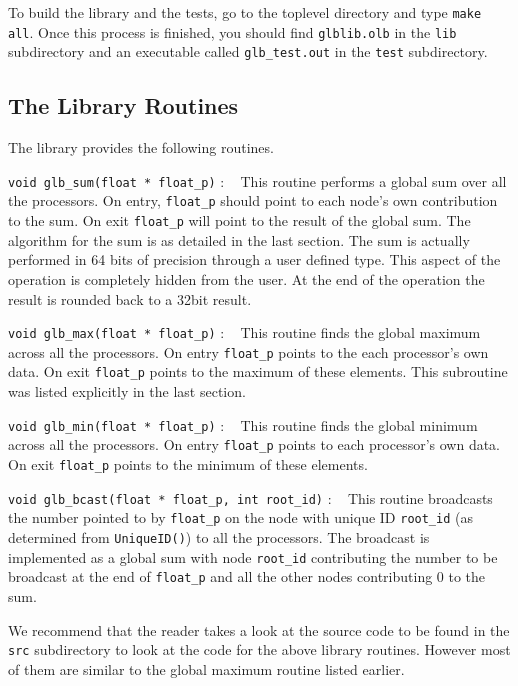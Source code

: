 To build the library and the tests, go to the toplevel directory 
and type {\tt make all}. Once this process is finished, you should
find {\tt glblib.olb} in the {\tt lib} subdirectory and an
executable called {\tt glb\_test.out} in the {\tt test} subdirectory.

\subsection{The Library Routines}
The library provides the following routines.
\begin{description}
\item{ {\tt void glb\_sum(float * float\_p)} : \ } This routine
performs a global sum over all the processors. On entry, {\tt float\_p} 
should point to each node's own contribution to the sum. On exit
{\tt float\_p} will point to the result of the global sum. The algorithm
for the sum is as detailed in the last section. The sum is actually 
performed in 64 bits of precision through a user defined type. This
aspect of the operation is completely hidden from the user. At the 
end of the operation the result is rounded back to a 32bit result. 
\item{ {\tt void glb\_max(float * float\_p)} : \ } This routine 
finds the global maximum across all the processors. On entry {\tt float\_p}
points to the each processor's own data. On exit {\tt float\_p} points
to the maximum of these elements. This subroutine was listed explicitly in
the last section.
\item{ {\tt void glb\_min(float * float\_p)} : \ } This routine
finds the global minimum across all the processors. On entry {\tt float\_p}
points to each processor's own data. On exit {\tt float\_p} points
to the minimum of these elements.
\item{ {\tt void glb\_bcast(float * float\_p, int root\_id)} : \ } This 
routine broadcasts the number pointed to by {\tt float\_p} on the node
with unique ID {\tt root\_id} (as determined from {\tt UniqueID()}) to
all the processors.  The broadcast is implemented as a global sum with
node {\tt root\_id} contributing the number to be broadcast at the end
of {\tt float\_p} and all the other nodes contributing 0 to the sum.
\end{description}

We recommend that the reader takes a look at the source code to be
found in the {\tt src} subdirectory to look at the code for the above 
library routines. However most of them are similar to the global
maximum routine listed earlier.

